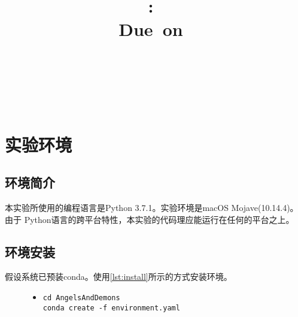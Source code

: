 \documentclass[a4paper]{article}
\title{
\vspace{2in}
\textmd{\textbf{\hmwkClass:\ \hmwkTitle}}\\
\normalsize\vspace{0.1in}\small{Due\ on\ \hmwkDueDate}\\
\vspace{0.1in}\large{\textit{\hmwkClassInstructor\ \hmwkClassTime}}
\vspace{3in}
}
\author{\textbf{\LARGE{\hmwkAuthorName}} \\ \\ \textbf{\LARGE{\hmwkAuthorId}}}
\date{} %
\begin{document}

\maketitle




\renewcommand{\contentsname}{Content} %
\newpage
\tableofcontents
{}
\newpage



\section{实验环境}
\subsection{环境简介}
本实验所使用的编程语言是Python 3.7.1。实验环境是macOS Mojave(10.14.4)。由于
Python语言的跨平台特性，本实验的代码理应能运行在任何的平台之上。 \\

\subsection{环境安装}
假设系统已预装conda。使用\autoref{lst:install}所示的方式安装环境。
\begin{figure}[!hbt]
\begin{itemize}
\item[] \begin{lstlisting}[style=myshell, label=lst:install, caption=安装环境的方式]
cd AngelsAndDemons
conda create -f environment.yaml
\end{lstlisting}
\end{itemize}
\end{figure}
\end{document}
